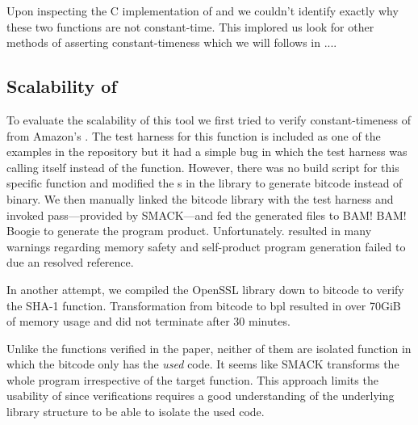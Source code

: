 Upon inspecting the C implementation of  and 
we couldn't identify exactly why these two functions are not constant-time.
This implored us look for other methods of asserting constant-timeness which
we will follows in ....



\subsection{Scalability of \ctVerif}

To evaluate the scalability of this tool we first tried to verify
constant-timeness of  from Amazon's
. The test harness for this function is included as one of the
examples in the \ctVerif repository but it had a simple bug in which the test
harness was calling itself instead of the  function.
However, there was no build script for this specific function and modified the
s in the  library to generate
 bitcode instead of binary. We then manually linked the bitcode
library with the test harness and invoked  pass---provided by
SMACK---and fed the generated  files to BAM! BAM! Boogie to
generate the program product. Unfortunately.  resulted in
many warnings regarding memory safety and self-product program generation failed
to due an resolved reference.


In another attempt, we compiled the OpenSSL library down to 
bitcode to verify the SHA-1 function. Transformation from bitcode to bpl
resulted in over 70GiB of memory usage and did not terminate after 30 minutes.


Unlike the functions verified in the paper, neither of them are isolated
function in which the bitcode only has the \emph{used} code. It seems like SMACK
transforms the whole program irrespective of the target function. This approach
limits the usability of \ctVerif since verifications requires a good
understanding of the underlying library structure to be able to isolate the used
code.

